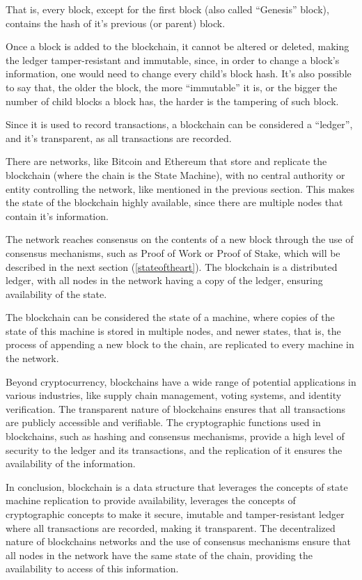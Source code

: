 That is, every block, except for the first block (also called ``Genesis'' block), contains the hash of it's previous (or parent) block.

Once a block is added to the blockchain, it cannot be altered or deleted, making the ledger tamper-resistant and immutable, since, in order to change a block's information, one would need to change every child's block hash.
It's also possible to say that, the older the block, the more ``immutable'' it is, or the bigger the number of child blocks a block has, the harder is the tampering of such block.

Since it is used to record transactions, a blockchain can be considered a ``ledger'', and it's transparent, as all transactions are recorded.

There are networks, like Bitcoin and Ethereum that store and replicate the blockchain (where the chain is the State Machine), with no central authority or entity controlling the network, like mentioned in the previous section. This makes the state of the blockchain highly available, since there are multiple nodes that contain it's information. 

The network reaches consensus on the contents of a new block through the use of consensus mechanisms, such as Proof of Work or Proof of Stake, which will be described in the next section (\ref{stateoftheart}).
The blockchain is a distributed ledger, with all nodes in the network having a copy of the ledger, ensuring availability of the state.

The blockchain can be considered the state of a machine, where copies of the state of this machine is stored in multiple nodes, and newer states, that is, the process of appending a new block to the chain, are replicated to every machine in the network.

Beyond cryptocurrency, blockchains have a wide range of potential applications in various industries, like supply chain management, voting systems, and identity verification. The transparent nature of blockchains ensures that all transactions are publicly accessible and verifiable. The cryptographic functions used in blockchains, such as hashing and consensus mechanisms, provide a high level of security to the ledger and its transactions, and the replication of it ensures the availability of the information.

In conclusion, blockchain is a data structure that leverages the concepts of state machine replication to provide availability, leverages the concepts of cryptographic concepts to make it secure, imutable and tamper-resistant ledger where all transactions are recorded, making it transparent.
The decentralized nature of blockchains networks and the use of consensus mechanisms ensure that all nodes in the network have the same state of the chain, providing the availability to access of this information.

